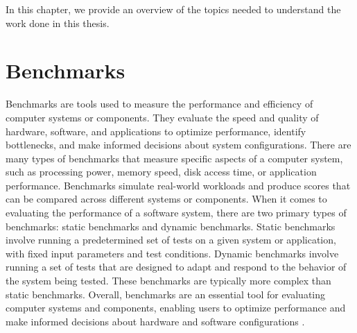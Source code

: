In this chapter, we provide an overview of the topics needed to understand the work done in this thesis.

\section{Benchmarks}
Benchmarks are tools used to measure the performance and efficiency of computer systems or components.
They evaluate the speed and quality of hardware, software, and applications to optimize performance, identify bottlenecks, and make informed decisions about system configurations.
There are many types of benchmarks that measure specific aspects of a computer system, such as processing power, memory speed, disk access time, or application performance.
Benchmarks simulate real-world workloads and produce scores that can be compared across different systems or components.
When it comes to evaluating the performance of a software system, there are two primary types of benchmarks: static benchmarks and dynamic benchmarks.
Static benchmarks involve running a predetermined set of tests on a given system or application, with fixed input parameters and test conditions.
Dynamic benchmarks involve running a set of tests that are designed to adapt and respond to the behavior of the system being tested. 
These benchmarks are typically more complex than static benchmarks.
Overall, benchmarks are an essential tool for evaluating computer systems and components, enabling users to optimize performance and make informed decisions about hardware and software configurations \cite{Benchmarking_2022, Benchmarking_2023}.

